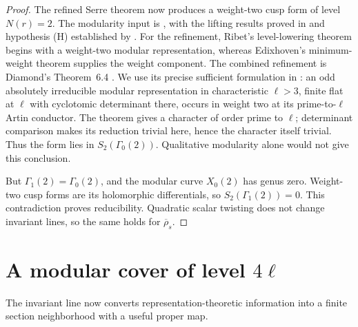 \documentclass[11pt,a4paper]{article}
\theoremstyle{plain}
\theoremstyle{definition}
\begin{document}
\begin{proof}
The refined Serre theorem now produces a weight-two cusp form of
level $N(r)=2$. The modularity input is
\citet[Theorem~9.1, author version p.~18]{kwone}, with the lifting
results proved in \citet[\S10.2--10.3, author version pp.~92--94]{kwtwo}
and hypothesis (H) established by
\citet[Theorem~0.1 and Corollary~0.2, author version p.~2]{kisin}.
For the refinement, Ribet's level-lowering theorem
\citep[Theorem~1.1, p.~432]{ribet} begins with a weight-two modular
representation, whereas Edixhoven's minimum-weight theorem
\citep[Theorem~4.5, author version p.~11]{edixhoven} supplies the
weight component. The combined refinement is Diamond's
Theorem~6.4 \citep{diamond}. We use its precise sufficient formulation
in \citet[Theorem~2.14, pp.~503--504]{wiles}: an odd absolutely
irreducible modular representation in characteristic $\ell>3$,
finite flat at $\ell$ with cyclotomic determinant there, occurs in
weight two at its prime-to-$\ell$ Artin conductor. The theorem
gives a character of order prime to $\ell$; determinant comparison
makes its reduction trivial here, hence the character itself trivial.
Thus the form lies in $S_2(\Gamma_0(2))$. Qualitative modularity
alone would not give this conclusion.

But $\Gamma_1(2)=\Gamma_0(2)$, and the modular curve $X_0(2)$ has
genus zero. Weight-two cusp forms are its holomorphic differentials,
so $S_2(\Gamma_1(2))=0$. This contradiction proves reducibility.
Quadratic scalar twisting does not change invariant lines, so the
same holds for $\overline\rho_s$.
\end{proof}

\section{A modular cover of level \texorpdfstring{$4\ell$}{four times the exponent}}\label{sec:modularcover}

The invariant line now converts representation-theoretic information into
a finite section neighborhood with a useful proper map.
\end{document}
